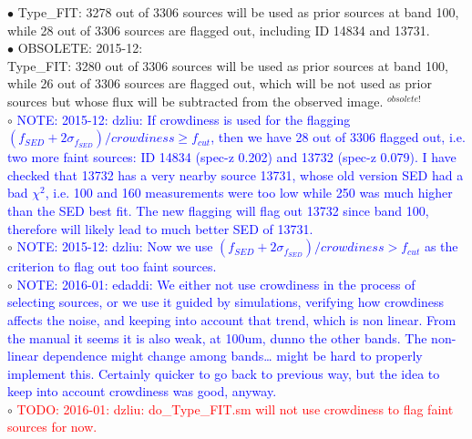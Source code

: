 \documentclass[11pt,a4paper]{article}
\begin{document}
\indent\hspace{15pt}$\bullet$ 
Type\_FIT: 3278 out of 3306 sources will be used as prior sources at band 100, while 28 out of 3306 sources are flagged out, including ID 14834 and 13731. 
\\
\textcolor{black!30!white}{
\indent\hspace{15pt}$\bullet$ 
OBSOLETE: 2015-12: \\
\indent\hspace{20pt}
Type\_FIT: 3280 out of 3306 sources will be used as prior sources at band 100, while 26 out of 3306 sources are flagged out, which will be not used as prior sources but whose flux will be subtracted from the observed image. 
$^{obsolete!}$
}
\\
\indent\hspace{15pt}$\circ$ 
\textcolor{blue}{NOTE: 2015-12: dzliu: If crowdiness is used for the flagging $(f_{SED}+2\sigma_{f_{SED}})/crowdiness \ge f_{cut}$, then we have 28 out of 3306 flagged out, i.e. two more faint sources: ID 14834 (spec-z 0.202) and 13732 (spec-z 0.079). I have checked that 13732 has a very nearby source 13731, whose old version SED had a bad $\chi^2$, i.e. 100 and 160 measurements were too low while 250 was much higher than the SED best fit. The new flagging will flag out 13732 since band 100, therefore will likely lead to much better SED of 13731. }
\\
\indent\hspace{15pt}$\circ$ 
\textcolor{blue}{NOTE: 2015-12: dzliu: Now we use $(f_{SED}+2\sigma_{f_{SED}})/crowdiness > f_{cut}$ as the criterion to flag out too faint sources.}
\\
\indent\hspace{15pt}$\circ$ 
\textcolor{blue}{NOTE: 2016-01: edaddi: We either not use crowdiness in the process of selecting sources, or we use it guided by simulations, verifying how crowdiness affects the noise, and keeping into account that trend, which is non linear. From the manual it seems it is also weak, at 100um, dunno the other bands. The non-linear dependence might change among bands… might be hard to properly implement this. Certainly quicker to go back to previous way, but the idea to keep into account crowdiness was good, anyway.}
\\
\indent\hspace{15pt}$\circ$ 
\textcolor{red}{TODO: 2016-01: dzliu: do\_Type\_FIT.sm will not use crowdiness to flag faint sources for now.}
\\
\end{document}
